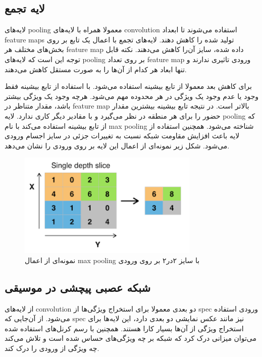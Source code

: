 \subsection{لایه تجمع}
لایه‌های \gls{pooling} معمولا همراه با لایه‌های \gls{convolution} استفاده
می‌شوند تا ابعداد \glspl{feature map} تولید شده را کاهش دهند. لایه‌های تجمع با
اعمال یک تابع بر روی بخش‌های مختلف هر \gls{feature map} داده شده، سایز آن‌را
کاهش می‌دهند. نکته قابل توجه این است که لایه‌های \gls{pooling} بر روی تعداد
\gls{feature map} ورودی تاثیری ندارند و تنها ابعاد هر کدام از آن‌ها را به صورت
مستقل کاهش می‌دهند.

برای کاهش بعد معمولا از تابع بیشینه استفاده می‌شود. با استفاده از تابع بیشینه
فقط وجود یا عدم وجود یک ویژگی در هر محدوده مهم می‌شود. هرچه وجود یک ویژگی بیشتر
باشد، مقدار متناظر در \gls{feature map} بالاتر است. در نتیجه تابع بیشینه بیشترین
مقدار حضور را برای هر منطقه در نظر می‌گیرد و با مقادیر دیگر کاری ندارد. لایه
\gls{pooling} که از تابع بیشینه استفاده می‌کند با نام \gls{max pooling} شناخته
می‌شود. همچنین استفاده از لایه باعث افزایش مقاومت شبکه نسبت به تغییرات جزئی در
سایز اجسام ورودی می‌شود. شکل زیر نمونه‌ای از اعمال این لایه بر روی ورودی را نشان
می‌دهد.
\begin{figure}[ht]
    \centering
    \includegraphics[height=5cm]{./statics/max_pooling.png}
    \caption{نمونه‌ای از اعمال \gls{max pooling} با سایز ۲در۲ بر روی ورودی}
\end{figure}

\subsection{شبکه عصبی پیچشی در موسیقی}
از لایه‌های \gls{convolution} دو بعدی معمولا برای استخراج ویژگی‌ها از \gls{spec}
ورودی استفاده می‌شود. از آن‌جایی که \gls{spec} نیز مانند عکس نمایشی دو بعدی
دارد، این لایه‌ها برای استخراج ویژگی از آن‌ها بسیار کارا هستند. همچنین با رسم
کرنل‌های استفاده شده می‌توان میزانی درک کرد که شبکه بر چه ویژگی‌های حساس شده است
و تلاش می‌کند چه ویژگی از ورودی را درک کند.


